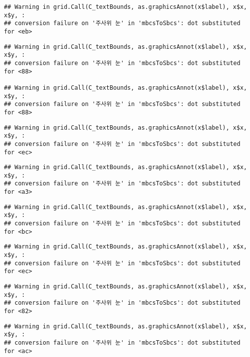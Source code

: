 \documentclass[]{book}
\begin{document}
\begin{verbatim}
## Warning in grid.Call(C_textBounds, as.graphicsAnnot(x$label), x$x, x$y, :
## conversion failure on '주사위 눈' in 'mbcsToSbcs': dot substituted for <eb>
\end{verbatim}

\begin{verbatim}
## Warning in grid.Call(C_textBounds, as.graphicsAnnot(x$label), x$x, x$y, :
## conversion failure on '주사위 눈' in 'mbcsToSbcs': dot substituted for <88>

## Warning in grid.Call(C_textBounds, as.graphicsAnnot(x$label), x$x, x$y, :
## conversion failure on '주사위 눈' in 'mbcsToSbcs': dot substituted for <88>
\end{verbatim}

\begin{verbatim}
## Warning in grid.Call(C_textBounds, as.graphicsAnnot(x$label), x$x, x$y, :
## conversion failure on '주사위 눈' in 'mbcsToSbcs': dot substituted for <ec>
\end{verbatim}

\begin{verbatim}
## Warning in grid.Call(C_textBounds, as.graphicsAnnot(x$label), x$x, x$y, :
## conversion failure on '주사위 눈' in 'mbcsToSbcs': dot substituted for <a3>
\end{verbatim}

\begin{verbatim}
## Warning in grid.Call(C_textBounds, as.graphicsAnnot(x$label), x$x, x$y, :
## conversion failure on '주사위 눈' in 'mbcsToSbcs': dot substituted for <bc>
\end{verbatim}

\begin{verbatim}
## Warning in grid.Call(C_textBounds, as.graphicsAnnot(x$label), x$x, x$y, :
## conversion failure on '주사위 눈' in 'mbcsToSbcs': dot substituted for <ec>
\end{verbatim}

\begin{verbatim}
## Warning in grid.Call(C_textBounds, as.graphicsAnnot(x$label), x$x, x$y, :
## conversion failure on '주사위 눈' in 'mbcsToSbcs': dot substituted for <82>
\end{verbatim}

\begin{verbatim}
## Warning in grid.Call(C_textBounds, as.graphicsAnnot(x$label), x$x, x$y, :
## conversion failure on '주사위 눈' in 'mbcsToSbcs': dot substituted for <ac>
\end{verbatim}
\end{document}
